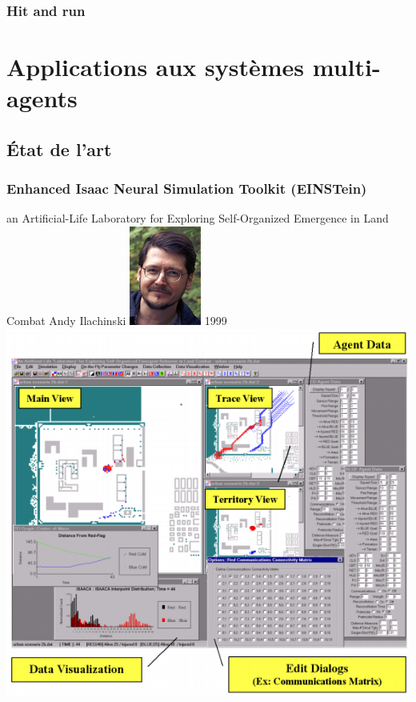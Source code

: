 \documentclass{article}
\begin{document}
\subsubsection{Hit and run}




\section{Applications aux systèmes multi-agents}

\subsection{État de l'art}

\subsubsection{Enhanced Isaac Neural Simulation Toolkit (EINSTein)}
an Artificial-Life Laboratory for Exploring Self-Organized Emergence in Land Combat
Andy Ilachinski
\includegraphics[]{../ressources/ilachinski}
1999
\includegraphics[width=\linewidth]{../ressources/Einstein}
\cite{simu_guerre,ilachinski1994,ilachinski1999}
\end{document}
